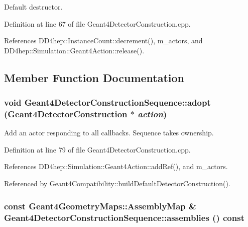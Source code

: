 Default destructor. 

Definition at line 67 of file Geant4DetectorConstruction.cpp.

References DD4hep::InstanceCount::decrement(), m\_\-actors, and DD4hep::Simulation::Geant4Action::release().

\subsection{Member Function Documentation}
\hypertarget{class_d_d4hep_1_1_simulation_1_1_geant4_detector_construction_sequence_a883d0336b5983474af9479c03e90a35b}{
\subsubsection[{adopt}]{\setlength{\rightskip}{0pt plus 5cm}void Geant4DetectorConstructionSequence::adopt ({\bf Geant4DetectorConstruction} $\ast$ {\em action})}}
\label{class_d_d4hep_1_1_simulation_1_1_geant4_detector_construction_sequence_a883d0336b5983474af9479c03e90a35b}


Add an actor responding to all callbacks. Sequence takes ownership. 

Definition at line 79 of file Geant4DetectorConstruction.cpp.

References DD4hep::Simulation::Geant4Action::addRef(), and m\_\-actors.

Referenced by Geant4Compatibility::buildDefaultDetectorConstruction().\hypertarget{class_d_d4hep_1_1_simulation_1_1_geant4_detector_construction_sequence_a914734773cc27cac0e21c92af06427bc}{
\subsubsection[{assemblies}]{\setlength{\rightskip}{0pt plus 5cm}const {\bf Geant4GeometryMaps::AssemblyMap} \& Geant4DetectorConstructionSequence::assemblies () const}}
\label{class_d_d4hep_1_1_simulation_1_1_geant4_detector_construction_sequence_a914734773cc27cac0e21c92af06427bc}


